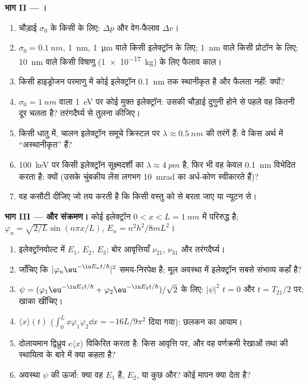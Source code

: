 \begin{problem}[{सप्ताहांत समस्या --- कब कोई इलेक्ट्रॉन कण है,
कब तरंग}]
\textbf{भाग II --- ।}
\begin{enumerate}[resume]
  \item चौड़ाई $\sigma_0$ के किसी  के लिए: $\Delta p$ और
        वेग-फैलाव $\Delta v$।
  \item $\sigma_0 = \qty{0.1}{nm}$, \qty{1}{nm}, \qty{1}{\micro m} वाले किसी इलेक्ट्रॉन के लिए;
        \qty{1}{nm} वाले किसी प्रोटॉन के लिए; \qty{10}{nm} वाले किसी
        विषाणु (\qty{1e-17}{kg}) के लिए फैलाव काल।
  \item किसी हाइड्रोजन परमाणु में कोई इलेक्ट्रॉन \qty{0.1}{nm} तक स्थानीकृत है
        और फैलता नहीं: क्यों?
  \item $\sigma_0 = \qty{1}{nm}$ वाला \qty{1}{eV} पर कोई मुक्त इलेक्ट्रॉन: उसकी चौड़ाई
        दुगुनी होने से पहले वह कितनी दूर चलता है? तरंगदैर्घ्य से
        तुलना कीजिए।
  \item किसी धातु में, चालन इलेक्ट्रॉन समूचे क्रिस्टल पर $\lambda \approx
        \qty{0.5}{nm}$ की तरंगें हैं: वे किस अर्थ में
        ``अस्थानीकृत'' हैं?
  \item \qty{100}{keV} पर किसी इलेक्ट्रॉन सूक्ष्मदर्शी का $\lambda \approx
        \qty{4}{pm}$ है, फिर भी वह केवल \qty{0.1}{nm} विभेदित करता है: क्यों (उसके चुंबकीय
        लेंस लगभग \qty{10}{mrad} का अर्ध-कोण स्वीकारते हैं)?
  \item वह कसौटी दीजिए जो तय करती है कि किसी वस्तु को
         से बरता जाए या न्यूटन से।
\end{enumerate}

\textbf{भाग III ---  और संक्रमण।}
कोई इलेक्ट्रॉन $0 < x < L = \qty{1}{nm}$ में परिरुद्ध है; $\varphi_n =
\sqrt{2/L}\sin(n\pi x/L)$, $E_n = n^2h^2/8mL^2$।
\begin{enumerate}[resume]
  \item इलेक्ट्रॉनवोल्ट में $E_1$, $E_2$, $E_3$; बोर आवृत्तियाँ
        $\nu_{21}$, $\nu_{31}$ और तरंगदैर्घ्य।
  \item जाँचिए कि $|\varphi_n\eu^{-\iu E_nt/\hbar}|^2$ समय-निरपेक्ष है;
        मूल अवस्था में इलेक्ट्रॉन सबसे संभाव्य कहाँ है?
  \item $\psi = (\varphi_1\eu^{-\iu E_1t/\hbar} + \varphi_2\eu^{-\iu E_2t/\hbar})/
        \sqrt2$ के लिए: $|\psi|^2$ $t = 0$ और $t = T_{21}/2$ पर; खाका खींचिए।
  \item $\langle x\rangle(t)$ ($\int_0^Lx\varphi_1\varphi_2\dd x = -16L/9\pi^2$ दिया गया):
        छलकन का आयाम।
  \item दोलायमान द्विध्रुव $e\langle x\rangle$ विकिरित करता है: किस
        आवृत्ति पर, और वह वर्णक्रमी रेखाओं तथा
         की स्थायित्व के बारे में क्या कहता है?
  \item अवस्था $\psi$ की ऊर्जा: क्या वह $E_1$ है, $E_2$, या कुछ
        और? कोई मापन क्या देता है?
\end{enumerate}


\end{problem}
